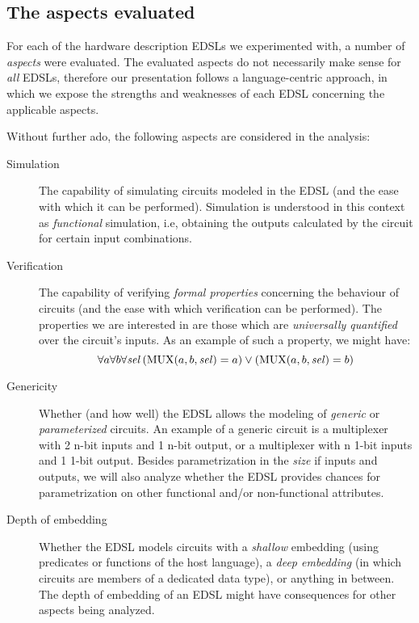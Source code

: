     \subsection{The aspects evaluated}
    \label{subsec:aspects}

        For each of the hardware description \acp{EDSL} we experimented with, a number of \emph{aspects}
        were evaluated. The evaluated aspects do not necessarily make sense for \emph{all}
        \acp{EDSL},
        therefore our presentation follows a language-centric approach, in which we expose the
        strengths and weaknesses of each \ac{EDSL} concerning the applicable aspects.

        Without further ado, the following aspects are considered in the analysis:

        \begin{description}
            \item[Simulation] The capability of simulating circuits modeled in the \ac{EDSL} (and the
            ease with which it can be performed). Simulation is understood in this context as
            \emph{functional} simulation, i.e, obtaining the outputs calculated by the circuit for
            certain input combinations.

            \item[Verification] The capability of verifying \emph{formal properties} concerning the
            behaviour of circuits (and the ease with which verification can be performed). The
            properties we are interested in are those which are \emph{universally quantified} over
            the circuit's inputs. As an example of such a property, we might have: \[ \forall a
            \forall b \forall \text{\textit{sel}} \left( \text{MUX}(a,b,\text{\textit{sel}}) = a
            \right) \vee \left( \text{MUX}(a,b,\text{\textit{sel}}) = b \right) \]

            \item[Genericity] Whether (and how well) the \ac{EDSL} allows the modeling of \emph{generic}
            or \emph{parameterized} circuits. An example of a generic circuit is a multiplexer with
            2 n-bit inputs and 1 n-bit output, or a multiplexer with n 1-bit inputs and 1 1-bit
            output. Besides parametrization in the \emph{size} if inputs and outputs, we will also
            analyze whether the \ac{EDSL} provides chances for parametrization on other functional and/or
            non-functional attributes.

            \item[Depth of embedding] Whether the \ac{EDSL} models circuits with a \emph{shallow}
            embedding (using predicates or functions of the host language), a \emph{deep embedding}
            (in which circuits are members of a dedicated data type), or anything in between. The
            depth of embedding of an \ac{EDSL} might have consequences for other aspects being analyzed.


\end{description}

